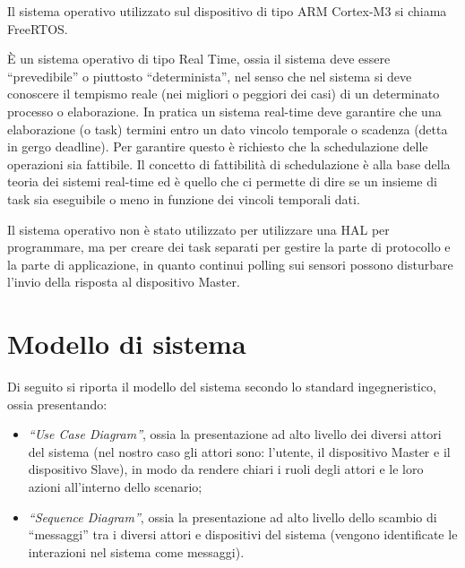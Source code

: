\documentclass[a4paper,titlepage]{book}
\begin{document}
Il sistema operativo utilizzato sul dispositivo di tipo ARM Cortex-M3 si chiama FreeRTOS. 

È un sistema operativo di tipo Real Time, ossia  il sistema deve essere ``prevedibile'' o piuttosto ``determinista'', nel senso che nel sistema si deve conoscere il tempismo reale (nei migliori o peggiori dei casi) di un determinato processo o elaborazione. In pratica un sistema real-time deve garantire che una elaborazione (o task) termini entro un dato vincolo temporale o scadenza (detta in gergo deadline). Per garantire questo è richiesto che la schedulazione delle operazioni sia fattibile. Il concetto di fattibilità di schedulazione è alla base della teoria dei sistemi real-time ed è quello che ci permette di dire se un insieme di task sia eseguibile o meno in funzione dei vincoli temporali dati.

Il sistema operativo non è stato utilizzato per utilizzare una HAL per programmare, ma per creare dei task separati per gestire la parte di protocollo e la parte di applicazione, in quanto continui polling sui sensori possono disturbare l'invio della risposta al dispositivo Master.




\chapter{Modello di sistema}

Di seguito si riporta il modello del sistema secondo lo standard ingegneristico, ossia presentando:
\begin{itemize}[noitemsep,topsep=23pt,parsep=23pt,partopsep=0pt]

\item\textit{``Use Case Diagram''}, ossia la presentazione ad alto livello dei diversi attori del sistema (nel nostro caso gli attori sono: l'utente, il dispositivo Master e il dispositivo Slave), in modo da rendere chiari i ruoli degli attori e le loro azioni all'interno dello scenario;
\item\textit{``Sequence Diagram''}, ossia la presentazione ad alto livello dello scambio di ``messaggi'' tra i diversi attori e dispositivi del sistema (vengono identificate le interazioni nel sistema come messaggi).

\end{itemize}
\end{document}
